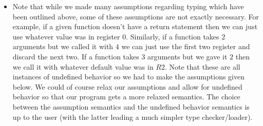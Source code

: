 \documentclass{article}
\begin{document}
\begin{itemize}
    \item Note that while we made many assumptions regarding typing which have been outlined above, some of these assumptions are not exactly necessary. For example, if a given function doesn't have a return statement then we can just use whatever value was in register $0$. Similarly, if a function takes $2$ arguments but we called it with $4$ we can just use the first two register and discard the next two. If a function takes $3$ arguments but we gave it $2$ then we call it with whatever default value was in $R2$. Note that these are all instances of undefined behavior so we had to make the assumptions given below. We could of course relax our assumptions and allow for undefined behavior so that our program gets a more relaxed semantics. The choice between the assumption semantics and the undefined behavior semantics is up to the user (with the latter leading a much simpler type checker/loader).
\end{itemize}
\end{document}

